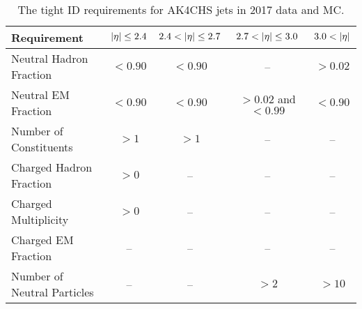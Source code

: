 \begin{table}[H]
    \caption{The tight ID requirements for AK4CHS jets in 2017 data and MC.}
    \begin{center}
        \begin{tabular}{lcccc}\hline\hline
            Requirement                 & $\lvert \eta \rvert \leq 2.4$         & $2.4 < \lvert \eta \rvert \leq 2.7$   & $2.7 < \lvert \eta \rvert \leq 3.0$   & $3.0 < \lvert \eta \rvert$ \\ \hline
            Neutral Hadron Fraction     & $< 0.90$                  & $< 0.90$                  & --                         & $> 0.02$ \\
            Neutral EM Fraction         & $< 0.90$                  & $< 0.90$                  & $> 0.02$ and $< 0.99$     & $< 0.90$ \\
            Number of Constituents      & $> 1$                     & $> 1$                     & --                         & -- \\	
            Charged Hadron Fraction     & $> 0$                     & --                         & --                         & -- \\
            Charged Multiplicity        & $> 0$                     & --                         & --                         & -- \\
            Charged EM Fraction         & --                         & --                         & --                         & -- \\ 
            Number of Neutral Particles & --                         & --                         & $> 2$                     & $> 10$ \\\hline\hline
        \end{tabular}
        \label{tab:2017jetid}
    \end{center}
\end{table}

